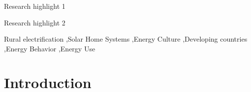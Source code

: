 \documentclass[final,3p,times,onecolumn]{elsarticle}
\begin{document}
\begin{frontmatter}

\author[inst3]{Jaime Zambrana}
\author[inst1]{Sergio Balderrama}
\author[inst2]{Silvain Quoilin}
\begin{abstract}

\end{abstract}

\begin{graphicalabstract}
\end{graphicalabstract}

\begin{highlights}
\item Research highlight 1
\item Research highlight 2
\end{highlights}

\begin{keyword}
Rural electrification \sep Solar Home Systems \sep Energy Culture \sep Developing countries \sep Energy Behavior \sep Energy Use

\end{keyword}

\end{frontmatter}


\section{Introduction}
\label{sec:sample1}
\end{document}
